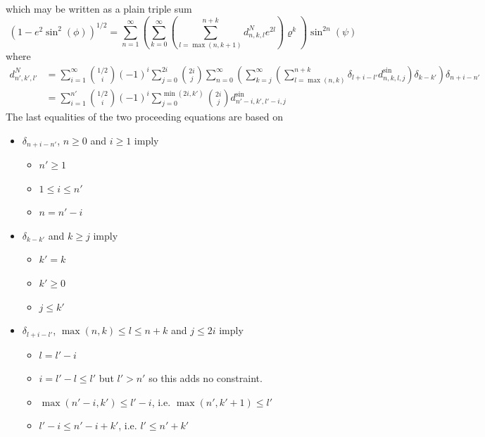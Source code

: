 \documentclass[a4paper]{amsart}
\begin{document}
which may be written as a plain triple sum
\begin{equation}
(1-e^2\sin^2(\phi))^{1/2}=\sum_{n=1}^\infty \left(\sum_{k=0}^\infty\left(\sum_{l=\max(n,k+1)}^{n+k} d^{N}_{n,k,l}e^{2l}\right)\varrho^k\right)\sin^{2n}(\psi)\label{eq:N}
\end{equation}
where
\begin{align*}
d^N_{n',k',l'}&=\!\sum_{i=1}^\infty\!\binom{1/2}{i}(-1)^i\sum_{j=0}^{2i}\!\binom{2i}{j}\!\sum_{n=0}^\infty \!\left(\sum_{k=j}^\infty\left(\sum_{l=\max(n,k)}^{n+k}\!\!\!\!\! \delta_{l+i-l'}d^{\sin}_{n,k,l,j}\!\right)\!\delta_{k-k'}\!\right)\!\delta_{n+i-n'}\\
&=\sum_{i=1}^{n'}\binom{1/2}{i}(-1)^i\sum_{j=0}^{\min(2i,k')}\binom{2i}{j}d^{\sin}_{n'-i,k',l'-i,j}
\end{align*}
The last equalities of the two proceeding equations are based on
\begin{itemize}
\item $\delta_{n+i-n'}$, $n\geq 0$ and $i\geq1$  imply
\begin{itemize}
\item $n'\geq 1$
\item $1\leq i\leq n'$
\item $n=n'-i$
\end{itemize}
\item $\delta_{k-k'}$ and $k\geq j$ imply
\begin{itemize}
\item $k'=k$
\item $k'\geq 0$
\item $j\leq k'$
\end{itemize}
\item $\delta_{l+i-l'}$, $\max(n,k)\leq l\leq n+k$ and $j\leq 2i$ imply
\begin{itemize}
\item $l=l'-i$
\item $i= l'-l\leq l'$ but $l'>n'$ so this adds no constraint.
\item $\max(n'-i,k')\leq l'-i$, i.e. $\max(n',k'+1)\leq l'$
\item $l'-i\leq n'-i+k'$, i.e. $l'\leq n'+k'$
\end{itemize}
\end{itemize}
\end{document}
